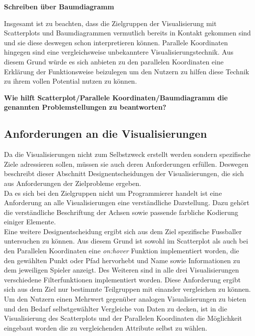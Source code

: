 \documentclass[usegeometry=true]{scrartcl}
\begin{document}
\textbf{Schreiben über Baumdiagramm}

Insgesamt ist zu beachten, dass die Zielgruppen der Visualisierung mit Scatterplots und Baumdiagrammen vermutlich bereits in Kontakt gekommen sind und sie diese deswegen schon interpretieren können. Parallele Koordinaten hingegen sind eine vergleichsweise unbekanntere Visualisierungstechnik. Aus diesem Grund würde es sich anbieten zu den parallelen Koordinaten eine Erklärung der Funktionsweise beizulegen um den Nutzern zu hilfen diese Technik zu ihrem vollen Potential nutzen zu können.


\textbf{Wie hilft Scatterplot/Parallele Koordinaten/Baumdiagramm die genannten Problemstellungen zu beantworten?}
\subsection{Anforderungen an die Visualisierungen}
Da die Visualisierungen nicht zum Selbstzweck erstellt werden sondern spezifische Ziele adressieren sollen, müssen sie auch deren Anforderungen erfüllen. Deswegen beschreibt dieser Abschnitt Designentscheidungen der Visualisierungen, die sich aus Anforderungen der Zielprobleme ergeben.\\
Da es sich bei den Zielgruppen nicht um Programmierer handelt ist eine Anforderung an alle Visualisierungen eine verständliche Darstellung. Dazu gehört die verständliche Beschriftung der Achsen sowie passende farbliche Kodierung einiger Elemente.\\
Eine weitere Designentscheidung ergibt sich aus dem Ziel spezifische Fussballer untersuchen zu können. Aus diesem Grund ist sowohl im Scatterplot als auch bei den Parallelen Koordinaten eine \textit{on:hover} Funktion implementiert worden, die den gewählten Punkt oder Pfad hervorhebt und Name sowie Informationen zu dem jeweiligen Spieler anzeigt.
Des Weiteren sind in alle drei Visualisierungen verschiedene Filterfunktionen implementiert worden. Diese Anforderung ergibt sich aus dem Ziel nur bestimmte Teilgruppen mit einander vergleichen zu können.
Um den Nutzern einen Mehrwert gegenüber analogen Visualisierungen zu bieten und den Bedarf selbstgewählter Vergleiche von Daten zu decken, ist in die Visualisierung des Scatterplots und der Parallelen Koordinaten die Möglichkeit eingebaut worden die zu vergleichenden Attribute selbst zu wählen.
\end{document}
